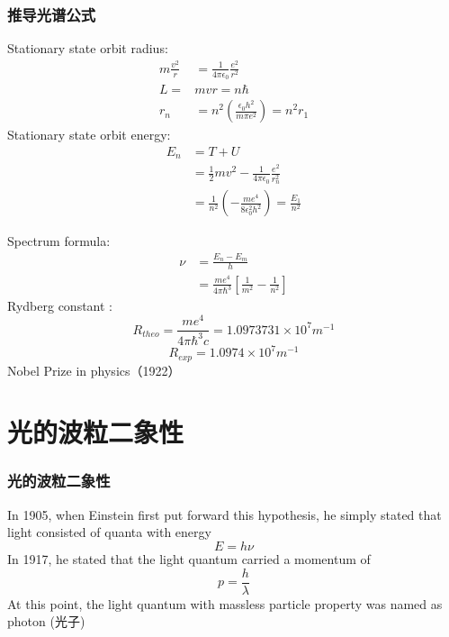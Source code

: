 \begin{frame}   
    \frametitle{推导光谱公式}
    \bullet Stationary state orbit radius:
    \begin{equation*}
        \begin{split}
            m\frac{v^2}{r}&=\frac{1}{4\pi\epsilon_0} \frac{e^2}{r^2} \\
            L=&mvr =n\hbar \\
            r_n&= n^2 (\frac{\epsilon_0 h^2}{m\pi e^2}) =n^2 r_1   
        \end{split} 
     \end{equation*}
     \bullet Stationary state orbit energy: 
     \begin{equation*}
        \begin{split}
            E_n &= T + U \\
            &= \frac{1}{2}mv^2- \frac{1}{4\pi\epsilon_0} \frac{e^2}{r_n ^2} \\
            &= \frac{1}{n^2} (-\frac{m e^4}{8 \epsilon_0 ^2 h^2}) = \frac{E_1}{n^2}
        \end{split}  
     \end{equation*}
\end{frame}

\begin{frame}
    \bullet Spectrum formula: 
    \begin{equation*}
        \begin{split}
         \nu&=\frac{E_n -E_m}{h} \\
         &= \frac{m e^4}{4\pi \hbar ^3} [\frac{1}{m^2} -\frac{1}{n^2}]
        \end{split}  
     \end{equation*}
     \bullet Rydberg constant : 
     \[R_{theo}= \frac{m e^4}{4\pi \hbar ^3 c} =1.0973731\times 10^7 m^{-1}\]
    \[R_{exp}=1.0974\times10^7 m^{-1} \]  
    {\color{deepred} Nobel Prize in physics（1922）}\\ 
\end{frame}

\section{光的波粒二象性}  
\begin{frame} 
  \frametitle{光的波粒二象性}  
  \bullet In 1905, when Einstein first put forward this hypothesis, 
  he simply stated that light consisted of quanta with energy \[ E = hν \] 
  \bullet In 1917, he stated that the light quantum carried a momentum of  \[ p=\frac{h}{\lambda}\]
  At this point, the light quantum with massless particle property was named as photon (光子)
\end{frame}

